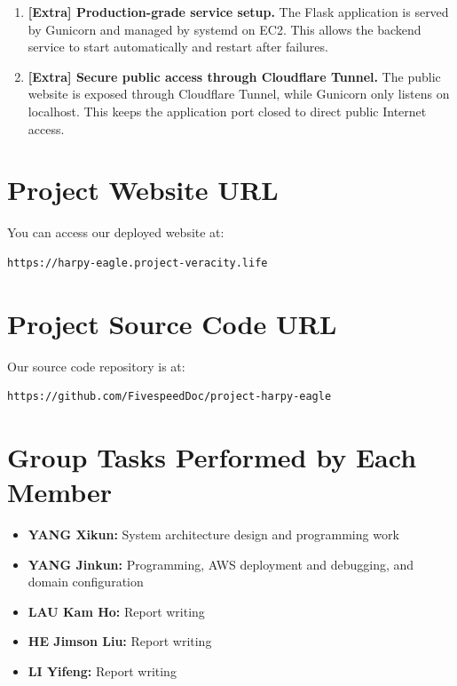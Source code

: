 \documentclass[12pt,a4paper]{article}
\begin{document}
\begin{enumerate}
    \item \textbf{[Extra] Production-grade service setup.}
    The Flask application is served by Gunicorn and managed by systemd on EC2. This allows the backend service to start automatically and restart after failures.

    \item \textbf{[Extra] Secure public access through Cloudflare Tunnel.}
    The public website is exposed through Cloudflare Tunnel, while Gunicorn only listens on localhost. This keeps the application port closed to direct public Internet access.
\end{enumerate}


\section{Project Website URL}

You can access our deployed website at:

\begin{lstlisting}
https://harpy-eagle.project-veracity.life
\end{lstlisting}

\section{Project Source Code URL}

Our source code repository is at:

\begin{lstlisting}
https://github.com/FivespeedDoc/project-harpy-eagle
\end{lstlisting}


\section{Group Tasks Performed by Each Member}

\begin{itemize}
    \item \textbf{YANG Xikun:} System architecture design and programming work
    \item \textbf{YANG Jinkun:} Programming, AWS deployment and debugging, and domain configuration
    \item \textbf{LAU Kam Ho:} Report writing
    \item \textbf{HE Jimson Liu:} Report writing
    \item \textbf{LI Yifeng:} Report writing
\end{itemize}
\end{document}
